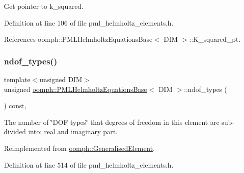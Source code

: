 Get pointer to k\+\_\+squared. 



Definition at line 106 of file pml\+\_\+helmholtz\+\_\+elements.\+h.



References oomph\+::\+P\+M\+L\+Helmholtz\+Equations\+Base$<$ D\+I\+M $>$\+::\+K\+\_\+squared\+\_\+pt.

\mbox{\label{classoomph_1_1PMLHelmholtzEquationsBase_ab061223c28ff7ee0c3423bcabc543161}} 
\subsubsection{\texorpdfstring{ndof\+\_\+types()}{ndof\_types()}}
{\footnotesize\ttfamily template$<$unsigned D\+IM$>$ \\
unsigned \hyperlink{classoomph_1_1PMLHelmholtzEquationsBase}{oomph\+::\+P\+M\+L\+Helmholtz\+Equations\+Base}$<$ D\+IM $>$\+::ndof\+\_\+types (\begin{DoxyParamCaption}{ }\end{DoxyParamCaption}) const\hspace{0.3cm}{\ttfamily [inline]}, {\ttfamily [virtual]}}



The number of \char`\"{}\+D\+O\+F types\char`\"{} that degrees of freedom in this element are sub-\/divided into\+: real and imaginary part. 



Reimplemented from \hyperlink{classoomph_1_1GeneralisedElement_a0c6037a870597b35dcf1c780710b9a56}{oomph\+::\+Generalised\+Element}.



Definition at line 514 of file pml\+\_\+helmholtz\+\_\+elements.\+h.

\mbox{\label{classoomph_1_1PMLHelmholtzEquationsBase_a7829f282edace6ed23d2042defb15186}} 
